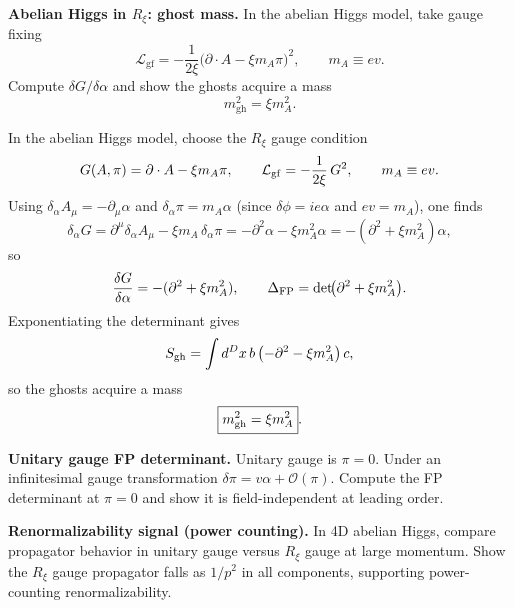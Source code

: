 \begin{problem}
    \textbf{Abelian Higgs in \(R_\xi\): ghost mass.} In the abelian Higgs model, take gauge fixing
    \[
        \mathcal{L}_{\text{gf}}=-\frac{1}{2\xi}\bigl(\partial\cdot A-\xi m_A\pi\bigr)^2,\qquad
        m_A\equiv e v.
    \]
    Compute \(\delta G/\delta\alpha\) and show the ghosts acquire a mass
    \[
        m_{\text{gh}}^2=\xi m_A^2.
    \]
\end{problem}
\begin{solution}[33.5]
	In the abelian Higgs model, choose the \(R_\xi\) gauge condition
	\[
	G(A,\pi)=\partial\cdot A-\xi m_A \pi,
	\qquad
	\mathcal L_{\rm gf}=-\frac{1}{2\xi}\,G^2,
	\qquad
	m_A\equiv ev.
	\]
	Using \(\delta_\alpha A_\mu=-\partial_\mu\alpha\) and \(\delta_\alpha\pi=m_A\alpha\) (since $\delta\phi=ie\alpha$ and $ev=m_A$), one finds
	\[
	\delta_\alpha G
	=\partial^\mu\delta_\alpha A_\mu-\xi m_A\,\delta_\alpha\pi
	=-\partial^2\alpha-\xi m_A^2\alpha
	=-(\partial^2+\xi m_A^2)\alpha,
	\]
	so
	\[
	\frac{\delta G}{\delta\alpha}=-(\partial^2+\xi m_A^2),
	\qquad
	\Delta_{\rm FP}=\det\!\bigl(\partial^2+\xi m_A^2\bigr).
	\]
	Exponentiating the determinant gives
	\[
	S_{\rm gh}=\int d^D x\, b\,\bigl(-\partial^2-\xi m_A^2\bigr)\,c,
	\]
	so the ghosts acquire a mass
	\[
	\boxed{
	m_{\rm gh}^2=\xi m_A^2}.
	\]
\end{solution}
\begin{problem}
    \textbf{Unitary gauge FP determinant.} Unitary gauge is \(\pi=0\). Under an infinitesimal gauge transformation \(\delta\pi=v\alpha+\mathcal{O}(\pi)\). Compute the FP determinant at \(\pi=0\) and show it is field-independent at leading order.
\end{problem}
\begin{problem}
    \textbf{Renormalizability signal (power counting).} In 4D abelian Higgs, compare propagator behavior in unitary gauge versus \(R_\xi\) gauge at large momentum. Show the \(R_\xi\) gauge propagator falls as \(1/p^2\) in all components, supporting power-counting renormalizability.
\end{problem}
